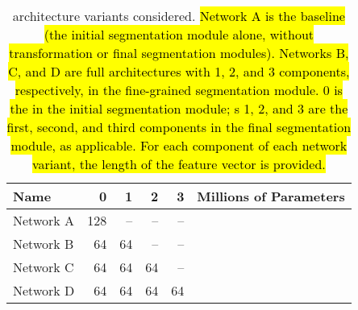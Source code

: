 \renewcommand{\captiontitle}{\CNN{} architecture variants considered}
\begin{table*}
\begin{center}
\begin{tabular}{lrrrrr} \hline
\toprule
Name      & \UNet{} 0 & \UNet{} 1 & \UNet{} 2 & \UNet{} 3 & Millions of Parameters \\
\midrule
Network A & 128       & --        & --        & --        & \MillionsOfParamsA{} \\
Network B & 64        & 64        & --        & --        & \MillionsOfParamsB{} \\
Network C & 64        & 64        & 64        & --        & \MillionsOfParamsC{} \\
Network D & 64        & 64        & 64        & 64        & \MillionsOfParamsD{} \\
\bottomrule
\end{tabular}
\caption[\captiontitle{}]{
\captiontitle{}.
\hl{
Network A is the baseline \UNet{} (the \hl{initial} segmentation module alone, without transformation or \hl{final} segmentation modules).
Networks B, C, and D are full \omeganet{} architectures with 1, 2, and 3 \UNet{} components, respectively, in the fine-grained segmentation module.
\UNet{} 0 is the \UNet{} in the \hl{initial} segmentation module; \UNet{}s 1, 2, and 3 are the first, second, and third \UNet{} components in the \hl{final} segmentation module, as applicable.
For each \UNet{} component of each network variant, the length of the feature vector is provided.
}
}
\label{tab:architecture-descriptions}
\end{center}
\end{table*}
